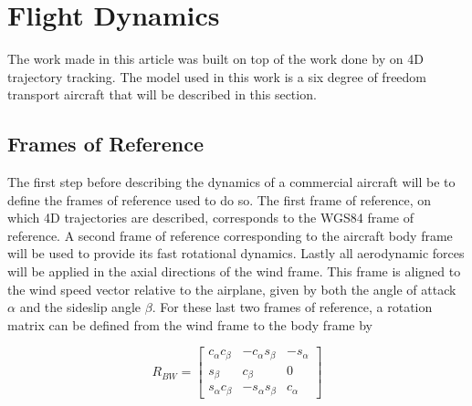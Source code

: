 
\section{Flight Dynamics}
\label{sec:backg}

The work made in this article was built on top of the work done by \cite{hector} on 4D trajectory tracking. The model used in this work is a six degree of freedom transport aircraft that will be described in this section. 

\subsection{Frames of Reference}

The first step before describing the dynamics of a commercial aircraft will be to define the frames of reference used to do so. The first frame of reference, on which 4D trajectories are described, corresponds to the WGS84 frame of reference. A second frame of reference corresponding to the aircraft body frame will be used to provide its fast rotational dynamics. Lastly all aerodynamic forces will be applied in the axial directions of the wind frame. This frame is aligned to the wind speed vector relative to the airplane, given by both the angle of attack $\alpha$ and the sideslip angle $\beta$. For these last two frames of reference, a rotation matrix can be defined from the wind frame to the body frame by


\begin{equation}
R_{BW}=
\begin{bmatrix}
c_\alpha c_\beta & -c_\alpha s_\beta & -s_\alpha \\
s_\beta & c_\beta & 0 \\
s_\alpha c_\beta & -s_\alpha s_\beta & c_\alpha
\end{bmatrix}
\label{eq:wind2body}
\end{equation}

